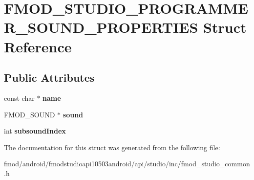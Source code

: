 \hypertarget{struct_f_m_o_d___s_t_u_d_i_o___p_r_o_g_r_a_m_m_e_r___s_o_u_n_d___p_r_o_p_e_r_t_i_e_s}{\section{F\+M\+O\+D\+\_\+\+S\+T\+U\+D\+I\+O\+\_\+\+P\+R\+O\+G\+R\+A\+M\+M\+E\+R\+\_\+\+S\+O\+U\+N\+D\+\_\+\+P\+R\+O\+P\+E\+R\+T\+I\+E\+S Struct Reference}
\label{struct_f_m_o_d___s_t_u_d_i_o___p_r_o_g_r_a_m_m_e_r___s_o_u_n_d___p_r_o_p_e_r_t_i_e_s}
}
\subsection*{Public Attributes}
\begin{DoxyCompactItemize}
\item 
\hypertarget{struct_f_m_o_d___s_t_u_d_i_o___p_r_o_g_r_a_m_m_e_r___s_o_u_n_d___p_r_o_p_e_r_t_i_e_s_a9c5ba9a7949496f8e9fda6f60da7a9f0}{const char $\ast$ {\bfseries name}}\label{struct_f_m_o_d___s_t_u_d_i_o___p_r_o_g_r_a_m_m_e_r___s_o_u_n_d___p_r_o_p_e_r_t_i_e_s_a9c5ba9a7949496f8e9fda6f60da7a9f0}

\item 
\hypertarget{struct_f_m_o_d___s_t_u_d_i_o___p_r_o_g_r_a_m_m_e_r___s_o_u_n_d___p_r_o_p_e_r_t_i_e_s_a17aaa4ce6dcbb06c488b9816fd874203}{F\+M\+O\+D\+\_\+\+S\+O\+U\+N\+D $\ast$ {\bfseries sound}}\label{struct_f_m_o_d___s_t_u_d_i_o___p_r_o_g_r_a_m_m_e_r___s_o_u_n_d___p_r_o_p_e_r_t_i_e_s_a17aaa4ce6dcbb06c488b9816fd874203}

\item 
\hypertarget{struct_f_m_o_d___s_t_u_d_i_o___p_r_o_g_r_a_m_m_e_r___s_o_u_n_d___p_r_o_p_e_r_t_i_e_s_a8d8837e9e58189abb44bc2d8fcafecf9}{int {\bfseries subsound\+Index}}\label{struct_f_m_o_d___s_t_u_d_i_o___p_r_o_g_r_a_m_m_e_r___s_o_u_n_d___p_r_o_p_e_r_t_i_e_s_a8d8837e9e58189abb44bc2d8fcafecf9}

\end{DoxyCompactItemize}


The documentation for this struct was generated from the following file\+:\begin{DoxyCompactItemize}
\item 
fmod/android/fmodstudioapi10503android/api/studio/inc/fmod\+\_\+studio\+\_\+common.\+h\end{DoxyCompactItemize}
